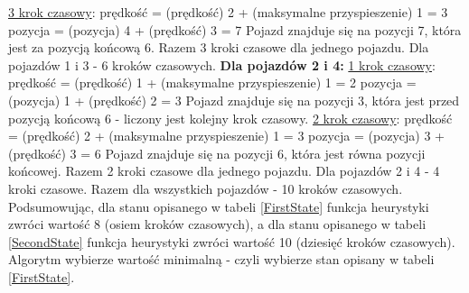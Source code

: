 \newline
\newline
\underline{3 krok czasowy}:
\newline
\newline
prędkość = (prędkość) 2 + (maksymalne przyspieszenie) 1 = 3
\newline
pozycja = (pozycja) 4 + (prędkość) 3 = 7
\newline
\newline
Pojazd znajduje się na pozycji 7, która jest za pozycją końcową 6.
\newline
\newline
Razem 3 kroki czasowe dla jednego pojazdu. Dla pojazdów 1 i 3 - 6 kroków czasowych.
\newline
\newline
\textbf{Dla pojazdów 2 i 4:}
\newline
\newline
\underline{1 krok czasowy}:
\newline
\newline
prędkość = (prędkość) 1 + (maksymalne przyspieszenie) 1 = 2
\newline
pozycja = (pozycja) 1 + (prędkość) 2 = 3
\newline
\newline
Pojazd znajduje się na pozycji 3, która jest przed pozycją końcową 6 - liczony jest kolejny krok czasowy.
\newline
\newline
\underline{2 krok czasowy}:
\newline
\newline
prędkość = (prędkość) 2 + (maksymalne przyspieszenie) 1 = 3
\newline
pozycja = (pozycja) 3 + (prędkość) 3 = 6
\newline
\newline
Pojazd znajduje się na pozycji 6, która jest równa pozycji końcowej.
\newline
\newline
Razem 2 kroki czasowe dla jednego pojazdu. Dla pojazdów 2 i 4 - 4 kroki czasowe.
\newline
\newline
Razem dla wszystkich pojazdów - 10 kroków czasowych.
\newline
\newline
\newline
Podsumowując, dla stanu opisanego w tabeli \ref{FirstState} funkcja heurystyki zwróci wartość 8 (osiem kroków czasowych), a dla stanu opisanego w tabeli \ref{SecondState} funkcja heurystyki zwróci wartość 10 (dziesięć kroków czasowych). Algorytm wybierze wartość minimalną - czyli wybierze stan opisany w tabeli \ref{FirstState}.

